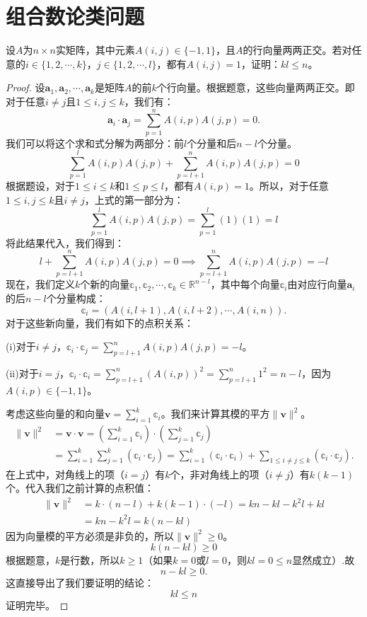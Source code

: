 \documentclass[../../main.tex]{subfiles}%
\begin{document}
\section{组合数论类问题}

\begin{example}
设$A$为$n \times n$实矩阵，其中元素$A(i,j) \in \{-1,1\}$，且$A$的行向量两两正交。若对任意的$i \in \{1,2,\cdots,k\}$，$j \in \{1,2,\cdots,l\}$，都有$A(i,j) = 1$，证明：$kl \leqslant n$。
\end{example}
\begin{proof}
设$\mathbf{a}_1, \mathbf{a}_2, \cdots, \mathbf{a}_k$是矩阵$A$的前$k$个行向量。根据题意，这些向量两两正交。即对于任意$i \neq j$且$1 \leqslant i, j \leqslant k$，我们有：
\[
\mathbf{a}_i \cdot \mathbf{a}_j = \sum_{p=1}^n A(i, p)A(j, p) = 0.
\]
我们可以将这个求和式分解为两部分：前$l$个分量和后$n - l$个分量。
\[
\sum_{p=1}^l A(i, p)A(j, p) + \sum_{p=l+1}^n A(i, p)A(j, p) = 0 
\]
根据题设，对于$1 \leqslant i \leqslant k$和$1 \leqslant p \leqslant l$，都有$A(i, p) = 1$。所以，对于任意$1 \leqslant i, j \leqslant k$且$i \neq j$，上式的第一部分为：
\[
\sum_{p=1}^l A(i, p)A(j, p) = \sum_{p=1}^l (1)(1) = l 
\]
将此结果代入，我们得到：
\[
l + \sum_{p=l+1}^n A(i, p)A(j, p) = 0 \implies \sum_{p=l+1}^n A(i, p)A(j, p) = -l 
\]
现在，我们定义$k$个新的向量$\mathbb{c}_1, \mathbb{c}_2, \cdots, \mathbb{c}_k \in \mathbb{R}^{n - l}$，其中每个向量$\mathbb{c}_i$由对应行向量$\mathbf{a}_i$的后$n - l$个分量构成：
\[
\mathbb{c}_i = (A(i, l + 1), A(i, l + 2), \cdots, A(i, n)).
\]
对于这些新向量，我们有如下的点积关系：

(i)对于$i \neq j$，$\mathbb{c}_i \cdot \mathbb{c}_j = \sum_{p=l+1}^n A(i, p)A(j, p) = -l$。

(ii)对于$i = j$，$\mathbb{c}_i \cdot \mathbb{c}_i = \sum_{p=l+1}^n (A(i, p))^2 = \sum_{p=l+1}^n 1^2 = n - l$，因为$A(i, p) \in \{-1, 1\}$。

考虑这些向量的和向量$\mathbf{v} = \sum_{i=1}^k \mathbb{c}_i$。我们来计算其模的平方$\|\mathbf{v}\|^2$。
\begin{align*}
\|\mathbf{v}\|^2 &= \mathbf{v} \cdot \mathbf{v} = \left( \sum_{i=1}^k \mathbb{c}_i \right) \cdot \left( \sum_{j=1}^k \mathbb{c}_j \right) \\
&= \sum_{i=1}^k \sum_{j=1}^k (\mathbb{c}_i \cdot \mathbb{c}_j)= \sum_{i=1}^k (\mathbb{c}_i \cdot \mathbb{c}_i) + \sum_{1 \leqslant i \neq j \leqslant k} (\mathbb{c}_i \cdot \mathbb{c}_j).
\end{align*}
在上式中，对角线上的项（$i = j$）有$k$个，非对角线上的项（$i \neq j$）有$k(k - 1)$个。代入我们之前计算的点积值：
\begin{align*}
\|\mathbf{v}\|^2 &= k \cdot (n - l) + k(k - 1) \cdot (-l) = kn - kl - k^2 l + kl \\
&= kn - k^2 l = k(n - kl)
\end{align*}
因为向量模的平方必须是非负的，所以$\|\mathbf{v}\|^2 \geqslant 0$。
\[
k(n - kl) \geqslant 0
\]
根据题意，$k$是行数，所以$k \geqslant 1$（如果$k = 0$或$l = 0$，则$kl = 0 \leqslant n$显然成立）.故
\[
n - kl \geqslant 0.
\]
这直接导出了我们要证明的结论：
\[
kl \leqslant n
\]
证明完毕。
\end{proof}
\end{document}
